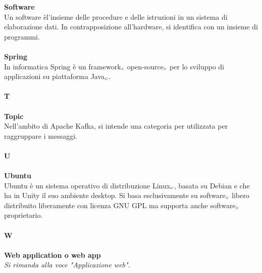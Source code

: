 \textbf{Software} \\
Un software èl'insieme delle procedure e delle istruzioni in un sistema di elaborazione dati. In contrapposizione all'hardware, si identifica con un insieme di programmi. \\
\\
\textbf{Spring} \\
In informatica Spring è un framework$_{\scaleto{G}{3pt}}$ open-source$_{\scaleto{G}{3pt}}$ per lo sviluppo di applicazioni su piattaforma Java$_{\scaleto{G}{3pt}}$.\\
\\
\textbf{T} \\
\\
\textbf{Topic}\\ 
Nell'ambito di Apache Kafka, si intende una categoria per utilizzata per raggruppare i messaggi.\\ 
\\
\textbf{U} \\
\\
\textbf{Ubuntu} \\
Ubuntu è un sistema operativo di distribuzione Linux$_{\scaleto{G}{3pt}}$, basata su Debian e che ha in Unity il suo ambiente desktop. Si basa esclusivamente su software$_{\scaleto{G}{3pt}}$ libero distribuito liberamente con licenza GNU GPL ma supporta anche software$_{\scaleto{G}{3pt}}$ proprietario. \\
\\
\textbf{W} \\
\\
\textbf{Web application o web app}\\
\textit{Si rimanda alla voce "Applicazione web".}
